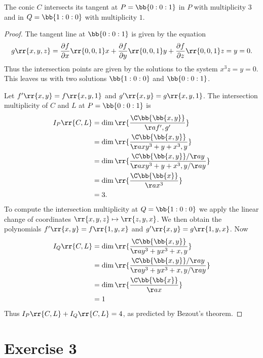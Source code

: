 \documentclass{article}
\begin{document}
\begin{claim*}[2]
  The conic $C$ intersects its tangent at $P=\bb{0:0:1}$ in $P$ with multiplicity $3$
  and in $Q=\bb{1:0:0}$ with multiplicity $1$.
  \begin{proof}
    The tangent line at $\bb{0:0:1}$ is given by the equation
    \begin{align*}
      g\rr{x,y,z}=
      \frac{\partial f}{\partial x}\rr{0,0,1}x
      +\frac{\partial f}{\partial y}\rr{0,0,1}y
      +\frac{\partial f}{\partial z}\rr{0,0,1}z
      = y
      =0.
    \end{align*}
    Thus the intersection points are given by the solutions to the system $x^3z=y=0$.
    This leaves us with two solutions $\bb{1:0:0}$ and $\bb{0:0:1}$.

    Let $f'\rr{x,y}=f\rr{x,y,1}$ and $g'\rr{x,y}=g\rr{x,y,1}$. The intersection multiplicity
    of $C$ and $L$ at $P=\bb{0:0:1}$ is
    \begin{align*}
      I_P\rr{C,L}
      &=\dim\rr{\frac{\C\bb{\bb{x,y}}}{\aa{f',g'}}}\\
      &=\dim\rr{\frac{\C\bb{\bb{x,y}}}{\aa{xy^3+y+x^3,y}}}\\
      &=\dim\rr{\frac{\C\bb{\bb{x,y}}/\aa{y}}{\aa{xy^3+y+x^3,y}/\aa{y}}}\\
      &=\dim\rr{\frac{\C\bb{\bb{x}}}{\aa{x^3}}}\\
      &= 3.
    \end{align*}
    To compute the intersection multiplicity at $Q=\bb{1:0:0}$ we apply the
    linear change of coordinates $\rr{x,y,z}\mapsto\rr{z,y,x}$. We then obtain
    the polynomials $f'\rr{x,y}=f\rr{1,y,x}$ and $g'\rr{x,y}=g\rr{1,y,x}$.
    Now
    \begin{align*}
      I_Q\rr{C,L}
    &=\dim\rr{\frac{\C\bb{\bb{x,y}}}{\aa{y^3+yx^3+x,y}}} \\
    &=\dim\rr{\frac{\C\bb{\bb{x,y}}/\aa{y}}{\aa{y^3+yx^3+x,y}/\aa{y}}} \\
    &=\dim\rr{\frac{\C\bb{\bb{x}}}{\aa{x}}} \\
    &= 1
    \end{align*}
    Thus $I_P\rr{C,L}+I_Q\rr{C,L}=4$, as predicted by Bezout's theorem.
  \end{proof}
\end{claim*}

\section*{Exercise 3}
\end{document}
